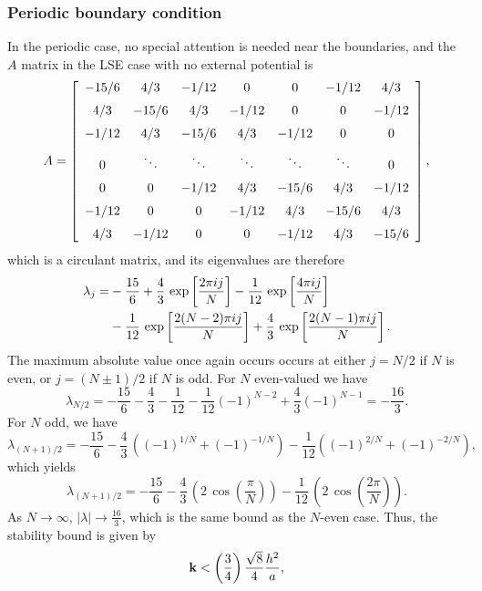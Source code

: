 \documentclass{article}
\begin{document}
\subsubsection{Periodic boundary condition}
\label{s:per2shoc}
In the periodic case, no special attention is needed near the boundaries, and the $A$ matrix in the LSE case with no external potential is
\[
A = \left[\begin {array}{cccccccc}
-15/6 &   4/3 & -1/12 &     0 &     0 &     -1/12 &   4/3\\\noalign{\medskip}
  4/3 & -15/6 &   4/3 & -1/12 &     0 &         0 & -1/12\\\noalign{\medskip}
-1/12 &   4/3 & -15/6 &   4/3 & -1/12 &         0 &     0\\\noalign{\medskip}
    0 &   \ddots &   \ddots &   \ddots &  \ddots &  \ddots &         0\\\noalign{\medskip}
    0 &         0 & -1/12 &   4/3 & -15/6 &   4/3 & -1/12\\\noalign{\medskip}
-1/12 &     0 &        0 & -1/12 &   4/3 & -15/6 &   4/3\\\noalign{\medskip}
  4/3 & -1/12 &        0 &     0 & -1/12 &   4/3 & -15/6\end {array} \right],
\]
which is a circulant matrix, and its eigenvalues are therefore
\begin{alignat}{2}
\lambda_j = &-\frac{15}{6} + \frac{4}{3}\,\exp\left[\frac{2\pi i j }{N}\right] - \frac{1}{12}\,\exp\left[\frac{4\pi i j }{N}\right]  \notag \\
&- \frac{1}{12}\,\exp\left[\frac{2(N-2)\pi i j }{N}\right] + \frac{4}{3}\,\exp\left[\frac{2(N-1)\pi i j }{N}\right]. \notag
\end{alignat}
The maximum absolute value once again occurs occurs at either $j=N/2$ if $N$ is even, or $j=(N\pm 1)/2$ if $N$ is odd. For $N$ even-valued we have
\[
\lambda_{N/2} = -\frac{15}{6} - \frac{4}{3} - \frac{1}{12} - \frac{1}{12}(-1)^{N-2} + \frac{4}{3}(-1)^{N-1} = -\frac{16}{3}.
\]
For $N$ odd, we have
\[
\lambda_{(N+1)/2} = -\frac{15}{6} - \frac{4}{3}\,\left((-1)^{1/N} + (-1)^{-1/N}\right) - \frac{1}{12}\left((-1)^{2/N} + (-1)^{-2/N}\right),
\]
which yields
\[
\lambda_{(N+1)/2} = -\frac{15}{6} -\frac{4}{3}\,\left(2\,\cos\left(\frac{\pi}{N}\right)\right) - \frac{1}{12}\,\left(2\,\cos\left(\frac{2\pi}{N}\right)\right).
\]
As $N\rightarrow \infty$, $|\lambda| \rightarrow \frac{16}{3}$, which is the same bound as the $N$-even case.  Thus, the stability bound is given by
\begin{equation}
\label{klinhoc1d}
{\bf k} < \left(\frac{3}{4}\right) \frac{\sqrt{8}}{4} \frac{h^2}{a},
\end{equation}
\end{document}
